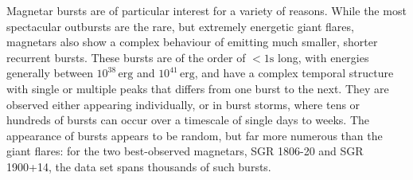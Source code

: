 \documentclass[12pt]{emulateapj}
\begin{document}

Magnetar bursts are of particular interest for a variety of reasons. While the most spectacular outbursts are the rare, but extremely energetic giant flares,
magnetars also show a complex behaviour of emitting much smaller, shorter recurrent bursts. These bursts are of the order of $<1\mathrm{s}$ long, with energies
generally between $10^{38}\,\mathrm{erg}$ and $10^{41}\,\mathrm{erg}$, and have a complex temporal structure with single or
multiple peaks that differs from one burst to the next. They are observed either appearing individually, or in burst 
storms, where tens or hundreds of bursts can occur over a timescale of single days to weeks\citep{mazets1999,goetz2006b,israel2008,mereghetti2009,savchenko2010,israel2010,scholz2011,dib2012,vanderhorst2012,vonkienlin2012}. 
The appearance of bursts appears to be random\citep{gogus1999,gogus2000}, but far more numerous than the giant flares: 
for the two best-observed magnetars, SGR 1806-20 and SGR 1900+14, the
data set spans thousands of such bursts. 
\end{document}

